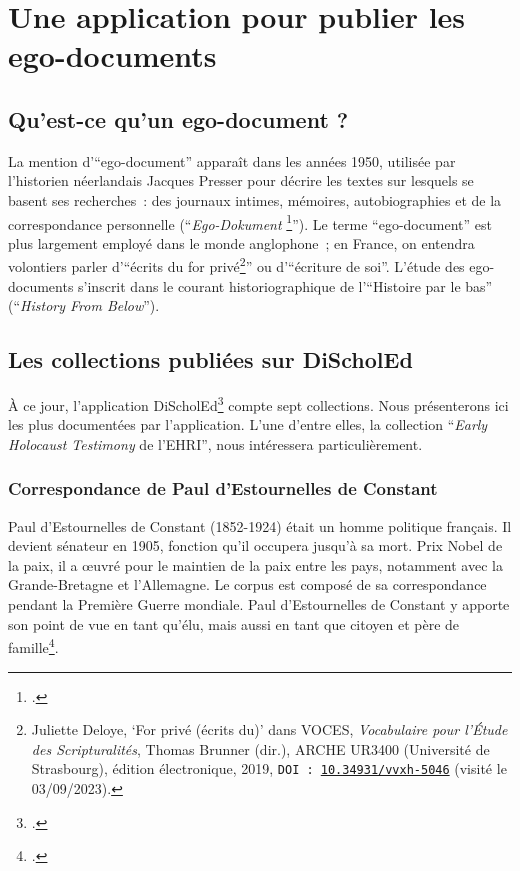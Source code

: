 
\section{Une application pour publier les ego-documents}

\subsection{Qu'est-ce qu'un ego-document ?}
La mention d'\enquote{ego-document} apparaît dans les années 1950, utilisée par l'historien néerlandais Jacques Presser pour décrire les textes sur lesquels se basent ses recherches~: des journaux intimes, mémoires, autobiographies et de la correspondance personnelle (\enquote{\textit{Ego-Dokument}  \footcite[p.~46]{AltedVigil2022}}). Le terme \enquote{ego-document} est plus largement employé dans le monde anglophone~; en France, on entendra volontiers parler d'\enquote{écrits du for privé\footnote{Juliette Deloye, \enquote{For privé (écrits du)} dans VOCES, \textit{Vocabulaire pour l'Étude des Scripturalités}, Thomas Brunner (dir.), ARCHE UR3400 (Université de Strasbourg), édition électronique, 2019, \texttt{DOI~: \href{https://doi.org/10.34931/vvxh-5046}{10.34931/vvxh-5046}} (visité le 03/09/2023).}} ou d'\enquote{écriture de soi}. L'étude des ego-documents s'inscrit dans le courant historiographique de l'\enquote{Histoire par le bas} (\enquote{\textit{History From Below}}).


\subsection{Les collections publiées sur DiScholEd}
À ce jour, l'application DiScholEd\footcite{DiScholEd} compte sept collections. Nous présenterons ici les plus documentées par l'application. L'une d'entre elles, la collection \enquote{\textit{Early Holocaust Testimony} de l'EHRI}, nous intéressera particulièrement.  

\subsubsection*{Correspondance de Paul d'Estournelles de Constant}
Paul d’Estournelles de Constant (1852-1924) était un homme politique français. Il devient sénateur en 1905, fonction qu'il occupera jusqu'à sa mort. Prix Nobel de la paix, il a \oe{}uvré pour le maintien de la paix entre les pays, notamment avec la Grande-Bretagne et l'Allemagne. Le corpus est composé de sa correspondance pendant la Première Guerre mondiale. Paul d'Estournelles de Constant y apporte son point de vue en tant qu'élu, mais aussi en tant que citoyen et père de famille\footcite[collection \enquote{Correspondance de Paul d'Estournelles de Constant}, section \enquote{\textit{History of the Corpus}} (visité le 03/09/2023)]{DiScholEd}.  

